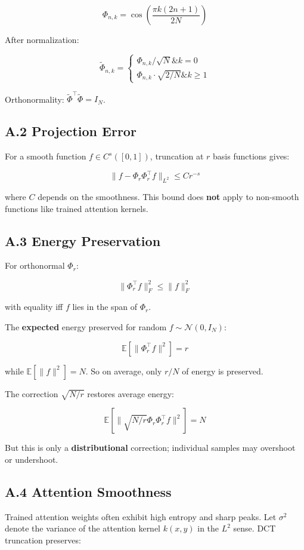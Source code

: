 \[
\Phi_{n, k} = \cos\!\left(\frac{\pi k (2n + 1)}{2N}\right)
\]

After normalization:

\[
\tilde{\Phi}_{n, k} = \begin{cases}
\Phi_{n, k} / \sqrt{N} \& k = 0 \\
\Phi_{n, k} \cdot \sqrt{2/N} \& k \geq 1
\end{cases}
\]

Orthonormality: $\tilde{\Phi}^\top \tilde{\Phi} = I_N$.

\subsection{A.2 Projection Error}

For a smooth function $f \in C^s([0, 1])$, truncation at $r$ basis 
functions gives:

\[
\|f - \Phi_r \Phi_r^\top f\|_{L^2} \leq C r^{-s}
\]

where $C$ depends on the smoothness. This bound does \textbf{not} apply to 
non-smooth functions like trained attention kernels.

\subsection{A.3 Energy Preservation}

For orthonormal $\Phi_r$:

\[
\|\Phi_r^\top f\|_F^2 \leq \|f\|_F^2
\]

with equality iff $f$ lies in the span of $\Phi_r$.

The \textbf{expected} energy preserved for random $f \sim \mathcal{N}(0, I_N)$:

\[
\mathbb{E}[\|\Phi_r^\top f\|^2] = r
\]

while $\mathbb{E}[\|f\|^2] = N$. So on average, only $r/N$ of energy 
is preserved.

The correction $\sqrt{N/r}$ restores average energy:

\[
\mathbb{E}[\|\sqrt{N/r} \Phi_r \Phi_r^\top f\|^2] = N
\]

But this is only a \textbf{distributional} correction; individual samples may 
overshoot or undershoot.

\subsection{A.4 Attention Smoothness}

Trained attention weights often exhibit high entropy and sharp peaks. Let 
$\sigma^2$ denote the variance of the attention kernel $k(x, y)$ in the 
$L^2$ sense. DCT truncation preserves:

